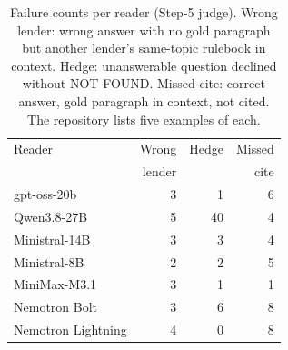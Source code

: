 \begin{table}[h]
\centering\small\setlength{\tabcolsep}{4pt}
\begin{tabular}{lrrr}
\toprule
Reader & Wrong & Hedge & Missed \\
 & lender & & cite \\
\midrule
gpt-oss-20b & 3 & 1 & 6 \\
Qwen3.8-27B & 5 & 40 & 4 \\
Ministral-14B & 3 & 3 & 4 \\
Ministral-8B & 2 & 2 & 5 \\
MiniMax-M3.1 & 3 & 1 & 1 \\
Nemotron Bolt & 3 & 6 & 8 \\
Nemotron Lightning & 4 & 0 & 8 \\
\bottomrule
\end{tabular}
\caption{Failure counts per reader (Step-5 judge). Wrong lender: wrong answer with no gold paragraph but another
lender's same-topic rulebook in context. Hedge: unanswerable question declined without NOT FOUND. Missed cite: correct
answer, gold paragraph in context, not cited. The repository lists five examples of each.}
\label{tab:failures}
\end{table}

